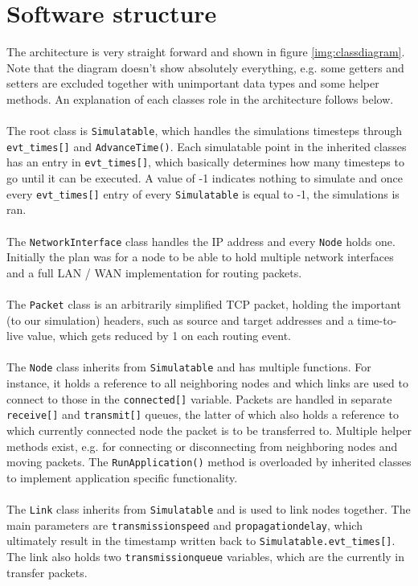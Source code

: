 \section{Software structure}
The architecture is very straight forward and shown in figure \ref{img:classdiagram}. Note that the diagram doesn't show absolutely everything, e.g. some getters and setters are excluded together with unimportant data types and some helper methods. An explanation of each classes role in the architecture follows below. 
\\\\
The root class is \texttt{Simulatable}, which handles the simulations timesteps through \texttt{evt\_times[]} and \texttt{AdvanceTime()}. Each simulatable point in the inherited classes has an entry in \texttt{evt\_times[]}, which basically determines how many timesteps to go until it can be executed. A value of -1 indicates nothing to simulate and once every \texttt{evt\_times[]} entry of every \texttt{Simulatable} is equal to -1, the simulations is ran.
\\\\
The \texttt{NetworkInterface} class handles the IP address and every \texttt{Node} holds one. Initially the plan was for a node to be able to hold multiple network interfaces and a full LAN / WAN implementation for routing packets.
\\\\
The \texttt{Packet} class is an arbitrarily simplified TCP packet, holding the important (to our simulation) headers, such as source and target addresses and a time-to-live value, which gets reduced by 1 on each routing event.
\\\\
The \texttt{Node} class inherits from \texttt{Simulatable} and has multiple functions. For instance, it holds a reference to all neighboring nodes and which links are used to connect to those in the \texttt{connected[]} variable. Packets are handled in separate \texttt{receive[]} and \texttt{transmit[]} queues, the latter of which also holds a reference to which currently connected node the packet is to be transferred to. Multiple helper methods exist, e.g. for connecting or disconnecting from neighboring nodes and moving packets. The \texttt{RunApplication()} method is overloaded by inherited classes to implement application specific functionality.
\\\\
The \texttt{Link} class inherits from \texttt{Simulatable} and is used to link nodes together. The main parameters are \texttt{transmissionspeed} and \texttt{propagationdelay}, which ultimately result in the timestamp written back to \texttt{Simulatable.evt\_times[]}. The link also holds two \texttt{transmissionqueue} variables, which are the currently in transfer packets.
